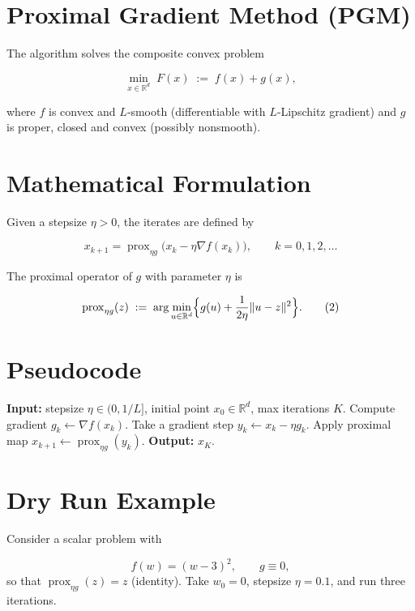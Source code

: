 \documentclass{article}
\newcommand{\prox}{\operatorname{prox}}
\newcommand{\R}{\mathbb{R}}
\begin{document}
\section*{Proximal Gradient Method (PGM)}

The algorithm solves the composite convex problem  

\[
\min_{x\in\R^{d}} \; F(x)\;:=\;f(x)+g(x),
\]

where $f$ is convex and $L$‑smooth (differentiable with $L$‑Lipschitz gradient) and $g$ is proper, closed and convex (possibly nonsmooth).

\section*{Mathematical Formulation}

Given a stepsize $\eta>0$, the iterates are defined by  

\[
\boxed{\;
x_{k+1}= \prox_{\eta g}\!\bigl(x_{k}-\eta \nabla f(x_{k})\bigr),\qquad k=0,1,2,\dots
\;}
\tag{1}
\]

The proximal operator of $g$ with parameter $\eta$ is  

\[
\prox_{\eta g}(z)\;:=\;\arg\min_{u\in\R^{d}}\Bigl\{ g(u)+\frac{1}{2\eta}\|u-z\|^{2}\Bigr\}.
\tag{2}
\]

\section*{Pseudocode}

\begin{algorithm}[H]
\caption{Proximal Gradient Method}
\begin{algorithmic}[1]
\STATE \textbf{Input:} stepsize $\eta\in(0,1/L]$, initial point $x_{0}\in\R^{d}$, max iterations $K$.
    \STATE Compute gradient $g_{k}\gets \nabla f(x_{k})$.
    \STATE Take a gradient step $y_{k}\gets x_{k}-\eta g_{k}$.
    \STATE Apply proximal map $x_{k+1}\gets \prox_{\eta g}(y_{k})$.
\ENDFOR
\STATE \textbf{Output:} $x_{K}$.
\end{algorithmic}
\end{algorithm}

\section*{Dry Run Example}

Consider a scalar problem with  

\[
f(w)=(w-3)^{2},\qquad g\equiv0,
\]
so that $\prox_{\eta g}(z)=z$ (identity).  
Take $w_{0}=0$, stepsize $\eta=0.1$, and run three iterations.
\end{document}
